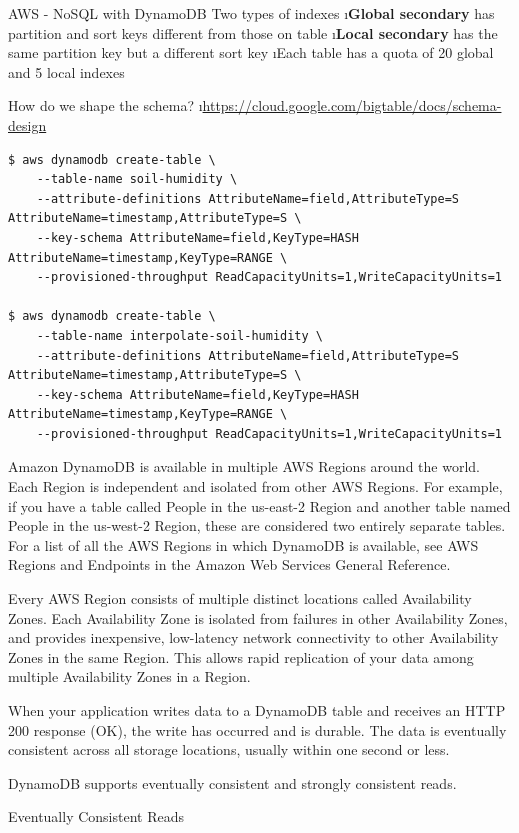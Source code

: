 \begin{frame}{AWS - NoSQL with DynamoDB}
Two types of indexes
\i \textbf{Global secondary} has partition and sort keys different from those on table
\i \textbf{Local secondary} has the same partition key but a different sort key
\i Each table has a quota of 20 global and 5 local indexes

How do we shape the schema?
\i \url{https://cloud.google.com/bigtable/docs/schema-design}

\begin{lstlisting}
$ aws dynamodb create-table \
    --table-name soil-humidity \
    --attribute-definitions AttributeName=field,AttributeType=S AttributeName=timestamp,AttributeType=S \
    --key-schema AttributeName=field,KeyType=HASH AttributeName=timestamp,KeyType=RANGE \
    --provisioned-throughput ReadCapacityUnits=1,WriteCapacityUnits=1
    
$ aws dynamodb create-table \
    --table-name interpolate-soil-humidity \
    --attribute-definitions AttributeName=field,AttributeType=S AttributeName=timestamp,AttributeType=S \
    --key-schema AttributeName=field,KeyType=HASH AttributeName=timestamp,KeyType=RANGE \
    --provisioned-throughput ReadCapacityUnits=1,WriteCapacityUnits=1
\end{lstlisting}

Amazon DynamoDB is available in multiple AWS Regions around the world. Each Region is independent and isolated from other AWS Regions. For example, if you have a table called People in the us-east-2 Region and another table named People in the us-west-2 Region, these are considered two entirely separate tables. For a list of all the AWS Regions in which DynamoDB is available, see AWS Regions and Endpoints in the Amazon Web Services General Reference.

Every AWS Region consists of multiple distinct locations called Availability Zones. Each Availability Zone is isolated from failures in other Availability Zones, and provides inexpensive, low-latency network connectivity to other Availability Zones in the same Region. This allows rapid replication of your data among multiple Availability Zones in a Region.

When your application writes data to a DynamoDB table and receives an HTTP 200 response (OK), the write has occurred and is durable. The data is eventually consistent across all storage locations, usually within one second or less.

DynamoDB supports eventually consistent and strongly consistent reads.

Eventually Consistent Reads


\end{frame}
